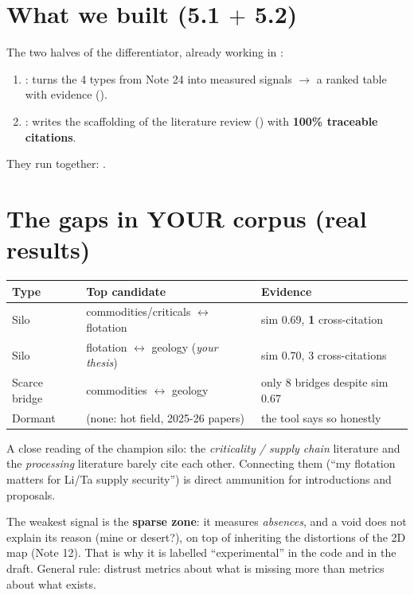\documentclass[11pt,a4paper]{article}
\begin{document}
\section{What we built (5.1 $+$ 5.2)}

The two halves of the differentiator, already working in :
\begin{enumerate}
  \item {}: turns the 4 types from Note 24 into measured signals
        $\rightarrow$ a ranked table with evidence
        ().
  \item {}: writes the scaffolding of the literature review
        () with \textbf{100\% traceable citations}.
\end{enumerate}
They run together: .

\section{The gaps in YOUR corpus (real results)}

\begin{center}
\begin{tabular}{lp{6.2cm}l}
\textbf{Type} & \textbf{Top candidate} & \textbf{Evidence} \\
\hline
Silo & commodities/criticals $\leftrightarrow$ flotation & sim 0.69, \textbf{1} cross-citation \\
Silo & flotation $\leftrightarrow$ geology (\emph{your thesis}) & sim 0.70, 3 cross-citations \\
Scarce bridge & commodities $\leftrightarrow$ geology & only 8 bridges despite sim 0.67 \\
Dormant & (none: hot field, 2025-26 papers) & the tool says so honestly \\
\end{tabular}
\end{center}

A close reading of the champion silo: the \emph{criticality / supply chain} literature and the
\emph{processing} literature barely cite each other. Connecting them (``my flotation matters
for Li/Ta supply security'') is direct ammunition for introductions and proposals.

\begin{ojo}
The weakest signal is the \textbf{sparse zone}: it measures \emph{absences}, and a void does
not explain its reason (mine or desert?), on top of inheriting the distortions of the 2D map
(Note 12). That is why it is labelled ``experimental'' in the code and in the draft. General
rule: distrust metrics about what is missing more than metrics about what exists.
\end{ojo}
\end{document}
